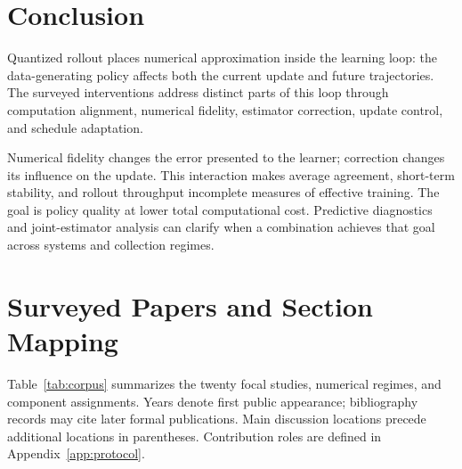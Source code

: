 \section{Conclusion}\label{sec:conclusion}
Quantized rollout places numerical approximation inside the learning loop: the data-generating policy affects both the current update and future trajectories. The surveyed interventions address distinct parts of this loop through computation alignment, numerical fidelity, estimator correction, update control, and schedule adaptation.

Numerical fidelity changes the error presented to the learner; correction changes its influence on the update. This interaction makes average agreement, short-term stability, and rollout throughput incomplete measures of effective training. The goal is policy quality at lower total computational cost. Predictive diagnostics and joint-estimator analysis can clarify when a combination achieves that goal across systems and collection regimes.

\clearpage
\appendix
\section{Surveyed Papers and Section Mapping}\label{app:corpus}
Table~\ref{tab:corpus} summarizes the twenty focal studies, numerical regimes, and component assignments. Years denote first public appearance; bibliography records may cite later formal publications. Main discussion locations precede additional locations in parentheses. Contribution roles are defined in Appendix~\ref{app:protocol}.

